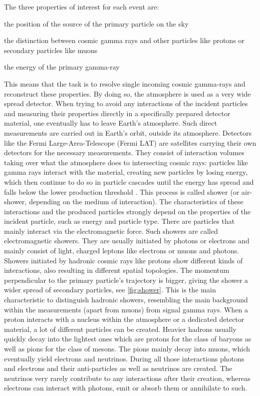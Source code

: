 The three properties of interest for each event are:
%
\begin{description}[labelsep=1em]
  \item[source position]{the position of the source of the primary particle on the sky}
  \item[particle type]{the distinction between cosmic gamma rays and other particles like protons or secondary particles like muons}
  \item[particle energy]{the energy of the primary gamma-ray}
\end{description}
%
This means that the task is to resolve single incoming cosmic gamma-rays and
reconstruct these properties. By doing so, the atmosphere is used as a very
wide spread detector. When trying to avoid any interactions of the incident
particles and measuring their properties directly in a specifically prepared
detector material, one eventually has to leave Earth's atmosphere. Such direct
measurements are carried out in Earth's orbit, outside its atmosphere.
Detectors like the Fermi Large-Area-Telescope \cite{fermiLAT} (Fermi LAT) are satellites
carrying their own detectors for the necessary measurements. They consist of
interaction volumes taking over what the atmosphere does to intersecting cosmic
rays: particles like gamma rays interact with the material, creating new
particles by losing energy, which then continue to do so in particle cascades
until the energy has spread and falls below the lower production threshold \cite{aharonian}. This process is called
shower (or air-shower, depending on the medium of interaction). The
characteristics of these interactions and the produced particles strongly
depend on the properties of the incident particle, such as energy and particle
type. There are particles that mainly interact via the electromagnetic force.
Such showers are called electromagnetic showers. They are usually initiated by
photons or electrons and mainly consist of light, charged leptons like electrons or muons and photons. Showers initiated by
hadronic cosmic rays like protons show different kinds of interactions, also
resulting in different spatial topologies. The momentum perpendicular to the
primary particle's trajectory is bigger, giving the shower a wider spread of
secondary particles, see \autoref{fig:shower}. This is the main characteristic to distinguish hadronic
showers, resembling the main background within the measurements (apart from
muons) from signal gamma rays. When a proton interacts with a
nucleus within the atmosphere or a dedicated detector material, a lot of
different particles can be created. Heavier hadrons usually quickly decay into
the lightest ones which are protons for the class of baryons as well as pions
for the class of mesons. The pions mainly decay into muons, which eventually
yield electrons and neutrinos. During all those interactions photons and
electrons and their anti-particles as well as neutrinos are created. The
neutrinos very rarely contribute to any interactions after their creation,
whereas electrons can interact with photons, emit or absorb them or annihilate
to such.

